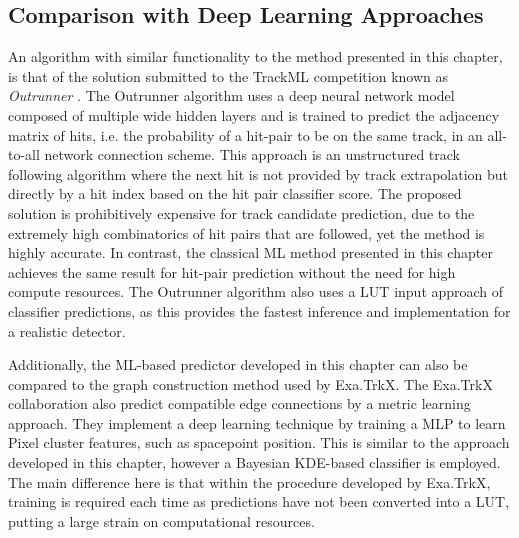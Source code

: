 \subsection{Comparison with Deep Learning Approaches}


An algorithm with similar functionality to the method presented in this chapter, is that of the solution submitted to the TrackML competition known as \textit{Outrunner} \cite{Amrouche_2019}. The Outrunner algorithm uses a deep neural network model composed of multiple wide hidden layers and is trained to predict the adjacency matrix of hits, i.e. the probability of a hit-pair to be on the same track, in an all-to-all network connection scheme. This approach is an unstructured track following algorithm where the next hit is not provided by track extrapolation but directly by a hit index based on the hit pair classifier score. The proposed solution is prohibitively expensive for track candidate prediction, due to the extremely high combinatorics of hit pairs that are followed, yet the method is highly accurate. In contrast, the classical ML method presented in this chapter achieves the same result for hit-pair prediction without the need for high compute resources. The Outrunner algorithm also uses a LUT input approach of classifier predictions, as this provides the fastest inference and implementation for a realistic detector.


Additionally, the ML-based predictor developed in this chapter can also be compared to the graph construction method used by Exa.TrkX. The Exa.TrkX collaboration also predict compatible edge connections by a metric learning approach. They implement a deep learning technique by training a MLP to learn Pixel cluster features, such as spacepoint position. This is similar to the approach developed in this chapter, however a Bayesian KDE-based classifier is employed. The main difference here is that within the procedure developed by Exa.TrkX, training is required each time as predictions have not been converted into a LUT, putting a large strain on computational resources.


